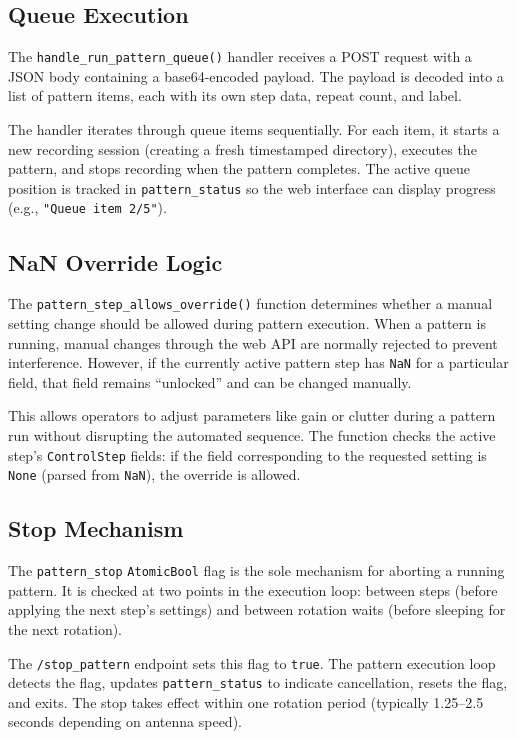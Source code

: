 \documentclass[11pt,letterpaper]{article}
\begin{document}
\subsection{Queue Execution}
\label{subsec:pattern-queue-exec}

The \texttt{handle\_run\_pattern\_queue()} handler receives a POST request with a JSON body containing a base64-encoded payload. The payload is decoded into a list of pattern items, each with its own step data, repeat count, and label.

The handler iterates through queue items sequentially. For each item, it starts a new recording session (creating a fresh timestamped directory), executes the pattern, and stops recording when the pattern completes. The active queue position is tracked in \texttt{pattern\_status} so the web interface can display progress (e.g., \texttt{"Queue item 2/5"}).

\subsection{NaN Override Logic}
\label{subsec:pattern-nan-logic}

The \texttt{pattern\_step\_allows\_override()} function determines whether a manual setting change should be allowed during pattern execution. When a pattern is running, manual changes through the web API are normally rejected to prevent interference. However, if the currently active pattern step has \texttt{NaN} for a particular field, that field remains ``unlocked'' and can be changed manually.

This allows operators to adjust parameters like gain or clutter during a pattern run without disrupting the automated sequence. The function checks the active step's \texttt{ControlStep} fields: if the field corresponding to the requested setting is \texttt{None} (parsed from \texttt{NaN}), the override is allowed.

\subsection{Stop Mechanism}
\label{subsec:pattern-stop}

The \texttt{pattern\_stop} \texttt{AtomicBool} flag is the sole mechanism for aborting a running pattern. It is checked at two points in the execution loop: between steps (before applying the next step's settings) and between rotation waits (before sleeping for the next rotation).

The \texttt{/stop\_pattern} endpoint sets this flag to \texttt{true}. The pattern execution loop detects the flag, updates \texttt{pattern\_status} to indicate cancellation, resets the flag, and exits. The stop takes effect within one rotation period (typically 1.25--2.5 seconds depending on antenna speed).
\end{document}
